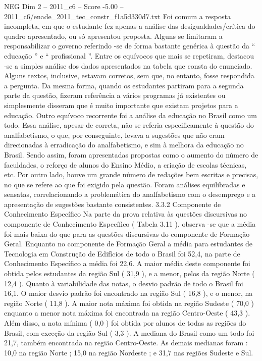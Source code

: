 \begin{textsample}{NEG Dim 2 – 2011\_c6 – Score -5.00 – 2011\_c6/enade\_2011\_tec\_constr\_f1a5d330d7.txt}
Foi comum a resposta incompleta, em que o estudante fez apenas a análise das desigualdades/crítica do quadro apresentado, ou só apresentou proposta.
Alguns se limitaram a responsabilizar o governo referindo -se de forma bastante genérica à questão da “ educação ” e “ profissional ”.
Entre os equívocos que mais se repetiram, destacou -se a simples análise dos dados apresentados na tabela que consta do enunciado.
Alguns textos, inclusive, estavam corretos, sem que, no entanto, fosse respondida a pergunta.
Da mesma forma, quando os estudantes partiram para a segunda parte da questão, fizeram referência a vários programas já existentes ou simplesmente disseram que é muito importante que existam projetos para a educação.
Outro equívoco recorrente foi a análise da educação no Brasil como um todo.
Essa análise, apesar de correta, não se referia especificamente à questão do analfabetismo, o que, por conseguinte, levava a sugestões que não eram direcionadas à erradicação do analfabetismo, e sim à melhora da educação no Brasil.
Sendo assim, foram apresentadas propostas como o aumento do número de faculdades, o reforço de alunos do Ensino Médio, a criação de escolas técnicas, etc.
Por outro lado, houve um grande número de redações bem escritas e precisas, no que se refere ao que foi exigido pela questão.
Foram análises equilibradas e sensatas, correlacionando a problemática do analfabetismo com o desemprego e a apresentação de sugestões bastante consistentes. 3.3.2 Componente de Conhecimento Específico Na parte da prova relativa às questões discursivas no componente de Conhecimento Específico ( Tabela 3.11 ), observa -se que a média foi mais baixa do que para as questões discursivas do componente de Formação Geral.
Enquanto no componente de Formação Geral a média para estudantes de Tecnologia em Construção de Edifícios de todo o Brasil foi 52,4, na parte de Conhecimento Específico a média foi 22,6.
A maior média deste componente foi obtida pelos estudantes da região Sul ( 31,9 ), e a menor, pelos da região Norte ( 12,4 ).
Quanto à variabilidade das notas, o desvio padrão de todo o Brasil foi 16,1.
O maior desvio padrão foi encontrado na região Sul ( 16,8 ), e o menor, na região Norte ( 11,8 ).
A maior nota máxima foi obtida na região Sudeste ( 70,0 ) enquanto a menor nota máxima foi encontrada na região Centro-Oeste ( 43,3 ).
Além disso, a nota mínima ( 0,0 ) foi obtida por alunos de todas as regiões do Brasil, com exceção da região Sul ( 3,3 ).
A mediana do Brasil como um todo foi 21,7, também encontrada na região Centro-Oeste.
As demais medianas foram : 10,0 na região Norte ; 15,0 na região Nordeste ; e 31,7 nas regiões Sudeste e Sul.

\end{textsample}
